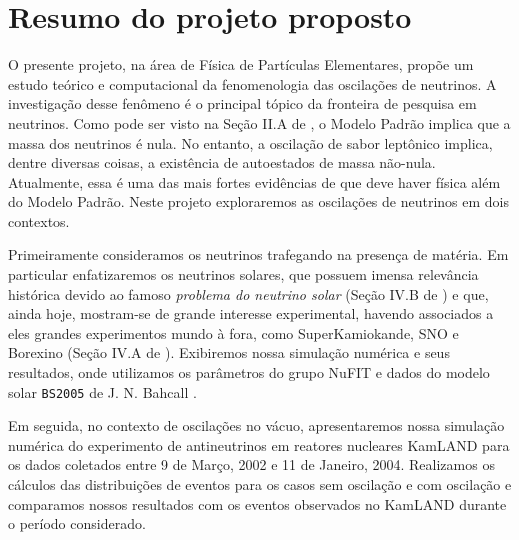 \documentclass[12pt]{report}
\begin{document}
%
%
\geraTitulo
%
\folhaDeRosto
%
%
%
\tableofcontents
\thispagestyle{empty}
\clearpage
%

\sectionfont{\scshape}

\chapter{Resumo do projeto proposto}\label{chp:resumoProj}

O presente projeto, na área de Física de Partículas Elementares, propõe um estudo teórico e computacional da fenomenologia das oscilações de neutrinos. A investigação desse fenômeno é o principal tópico da fronteira de pesquisa em neutrinos. Como pode ser visto na Seção II.A de \cite{gonzalez}, o Modelo Padrão implica que a massa dos neutrinos é nula. No entanto, a oscilação de sabor leptônico implica, dentre diversas coisas, a existência de autoestados de massa não-nula. Atualmente, essa é uma das mais fortes evidências de que deve haver física além do Modelo Padrão. Neste projeto exploraremos as oscilações de neutrinos em dois contextos.

Primeiramente consideramos os neutrinos trafegando na presença de matéria. Em particular enfatizaremos os neutrinos solares, que possuem imensa relevância histórica devido ao famoso \textit{problema do neutrino solar} (Seção IV.B de \cite{gonzalez}) e que, ainda hoje, mostram-se de grande interesse experimental, havendo associados a eles grandes experimentos mundo à fora, como SuperKamiokande, SNO e Borexino (Seção IV.A de \cite{gonzalez}). Exibiremos nossa simulação numérica e seus resultados, onde utilizamos os parâmetros do grupo NuFIT \cite{nufit} e dados do modelo solar \texttt{BS2005} de J. N. Bahcall \cite{bahcall, bahcall-model}.

Em seguida, no contexto de oscilações no vácuo, apresentaremos nossa simulação numérica do experimento de antineutrinos em reatores nucleares KamLAND \cite{spectral-distortion} para os dados coletados entre 9 de Março, 2002 e 11 de Janeiro, 2004. Realizamos os cálculos das distribuições de eventos para os casos sem oscilação e com oscilação e comparamos nossos resultados com os eventos observados no KamLAND \cite{kamland-data} durante o período considerado.
\end{document}
